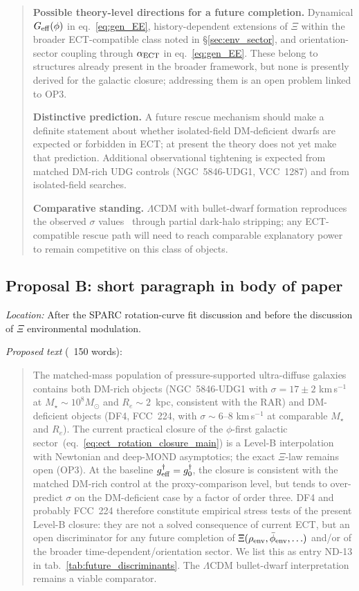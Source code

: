 \documentclass[11pt]{article}
\begin{document}
\begin{quote}
\textbf{Possible theory-level directions for a future completion.}
Dynamical $G_{\rm eff}(\phi)$ in eq.~\ref{eq:gen_EE},
history-dependent extensions of $\Xi$ within the broader
ECT-compatible class noted in \S\ref{sec:env_sector}, and
orientation-sector coupling through $\alpha_{\rm ECT}$ in
eq.~\ref{eq:gen_EE}. These belong to structures already present in the
broader framework, but none is presently derived for the galactic
closure; addressing them is an open problem linked to OP3.

\textbf{Distinctive prediction.} A future rescue mechanism should make
a definite statement about whether isolated-field DM-deficient dwarfs
are expected or forbidden in ECT; at present the theory does not yet
make that prediction. Additional observational tightening is expected
from matched DM-rich UDG controls (NGC~5846-UDG1, VCC~1287) and from
isolated-field searches.

\textbf{Comparative standing.} $\Lambda$CDM with bullet-dwarf
formation reproduces the observed $\sigma$
values~\cite{Ogiya2018DF2tidal,Moreno2022DMfree,vanDokkum2022bullet}
through partial dark-halo stripping; any ECT-compatible rescue path
will need to reach comparable explanatory power to remain competitive
on this class of objects.
\end{quote}

\subsection{Proposal B: short paragraph in body of paper}

\textit{Location:} After the SPARC rotation-curve fit discussion and
before the discussion of $\Xi$ environmental modulation.

\textit{Proposed text} (~150 words):

\begin{quote}\small
The matched-mass population of pressure-supported ultra-diffuse
galaxies contains both DM-rich objects (NGC~5846-UDG1 with
$\sigma=17\pm 2$ km\,s$^{-1}$ at $M_\star\sim 10^{8}M_\odot$ and
$R_e\sim 2$~kpc, consistent with the RAR) and DM-deficient objects
(DF4, FCC~224, with $\sigma\sim 6$--$8$ km\,s$^{-1}$ at comparable
$M_\star$ and $R_e$). The current practical closure of the $\phi$-first
galactic sector~(eq.~\ref{eq:ect_rotation_closure_main}) is a Level-B
interpolation with Newtonian and deep-MOND asymptotics; the exact
$\Xi$-law remains open (OP3). At the baseline
$g^\dagger_{\rm eff}=g^\dagger_0$, the closure is consistent with the
matched DM-rich control at the proxy-comparison level, but tends to
over-predict $\sigma$ on the DM-deficient case by a factor of order
three. DF4 and probably FCC~224 therefore constitute empirical
stress tests of the present Level-B closure: they are not a solved
consequence of current ECT, but an open discriminator for any future
completion of $\Xi(\rho_{\rm env},\bar\phi_{\rm env},\ldots)$ and/or
of the broader time-dependent/orientation sector. We list this as
entry ND-13 in tab.~\ref{tab:future_discriminants}. The $\Lambda$CDM
bullet-dwarf interpretation remains a viable comparator.
\end{quote}
\end{document}
